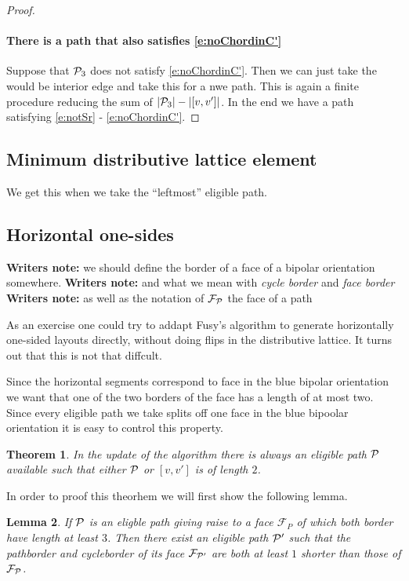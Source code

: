 \documentclass[a4paper]{article}
\newtheorem{thrm}{Theorem}
\newtheorem{lemma}[thrm]{Lemma}
\theoremstyle{definition}
\newcommand{\scr}[1]{\mathcal{#1}}
\newcommand{\F}{\mathbb{F}}
\newcommand{\note}{\textbf{Writers note: }}
\begin{document}
\begin{proof}

\paragraph{There is a path that also satisfies \ref{e:noChordinC'}}
Suppose that $\P_3$ does not satisfy \ref{e:noChordinC'}. Then we can just take the would be interior edge and take this for a nwe path. This is again a finite procedure reducing the sum of $|\P_3| -|[v,v']|$. In the end we have a path satisfying \ref{e:notSr} - \ref{e:noChordinC'}.



\end{proof}

\subsection{Minimum distributive lattice element}
We get this when we take the    ``leftmost'' eligible path. 

\renewcommand{\F}{\scr F}
\subsection{Horizontal one-sides}
\note we should define the border of a face of a bipolar orientation somewhere. 
\note and what we mean with \emph{cycle border} and \emph{face border}
\note as well as the notation of $\F_\P$ the face of a path

As an exercise one could try to addapt Fusy's algorithm to generate horizontally one-sided layouts directly, without doing flips in the distributive lattice. It turns out that this is not that diffcult.

Since the horizontal segments correspond to face in the blue bipolar orientation we want that one of the two borders of the face has a length of at most two. Since every eligible path we take splits off one face in the blue bipoolar orientation it is easy to control this property.

\begin{thrm}
\label{th:blueelig}
In the update of the algorithm there is always an eligible path $\P$ available such that either $\P$ or $[v,v']$ is of length $2$. 
\end{thrm}

In order to proof this theorhem we will first show the following lemma.

\begin{lemma}
\label{lem:bluealgo}
If $\P$ is an eligble path giving raise to a face $\F_P$ of which both border have length at least $3$. Then there exist an eligible path $\P'$ such that the pathborder and cycleborder of its face $\F_{\P'}$ are both at least $1$ shorter than those of $\F_\P$.
\end{lemma}
\end{document}

